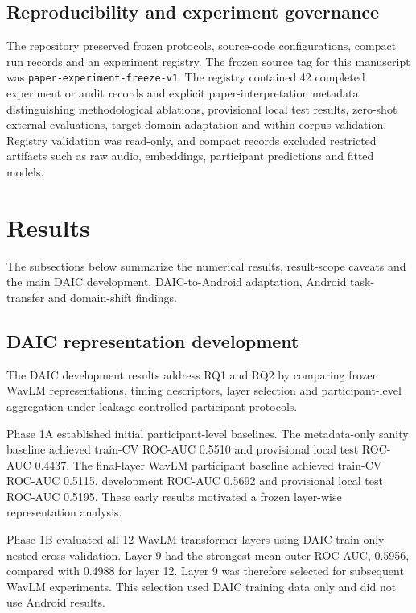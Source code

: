 \documentclass[lettersize,journal]{IEEEtran}
\begin{document}
\subsection{Reproducibility and experiment governance}

The repository preserved frozen protocols, source-code configurations, compact run records and an experiment registry. The frozen source tag for this manuscript was \texttt{paper-experiment-freeze-v1}. The registry contained 42 completed experiment or audit records and explicit paper-interpretation metadata distinguishing methodological ablations, provisional local test results, zero-shot external evaluations, target-domain adaptation and within-corpus validation. Registry validation was read-only, and compact records excluded restricted artifacts such as raw audio, embeddings, participant predictions and fitted models.

\section{Results}

The subsections below summarize the numerical results, result-scope caveats and the main DAIC development, DAIC-to-Android adaptation, Android task-transfer and domain-shift findings.

\subsection{DAIC representation development}

The DAIC development results address RQ1 and RQ2 by comparing frozen WavLM representations, timing descriptors, layer selection and participant-level aggregation under leakage-controlled participant protocols.

Phase 1A established initial participant-level baselines. The metadata-only sanity baseline achieved train-CV ROC-AUC 0.5510 and provisional local test ROC-AUC 0.4437. The final-layer WavLM participant baseline achieved train-CV ROC-AUC 0.5115, development ROC-AUC 0.5692 and provisional local test ROC-AUC 0.5195. These early results motivated a frozen layer-wise representation analysis.

Phase 1B evaluated all 12 WavLM transformer layers using DAIC train-only nested cross-validation. Layer 9 had the strongest mean outer ROC-AUC, 0.5956, compared with 0.4988 for layer 12. Layer 9 was therefore selected for subsequent WavLM experiments. This selection used DAIC training data only and did not use Android results.
\end{document}
